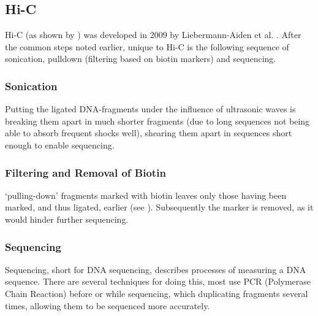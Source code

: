 



\subsection{Hi-C}\label{sec:HiC}

Hi-C (as shown by ) was developed in 2009 by Liebermann-Aiden et al.
\cite{lieberman2009comprehensive}. After the common steps noted earlier, unique
to Hi-C is the following sequence of sonication, pulldown (filtering based on
biotin markers) and sequencing.

\subsubsection{Sonication}\label{sec:sonication}

Putting the ligated DNA-fragments under the influence of ultrasonic waves is
breaking them apart in much shorter fragments (due to long sequences not being
able to absorb frequent shocks well), shearing them apart in sequences short
enough to enable sequencing.

\subsubsection{Filtering and Removal of Biotin}\label{sec:pulldown}

`pulling-down' fragments marked with biotin leaves only those having been
marked, and thus ligated, earlier (see ). Subsequently the
marker is removed, as it would hinder further sequencing.

\subsubsection{Sequencing}\label{sec:sequencing}

Sequencing, short for DNA sequencing, describes processes of measuring a DNA
sequence. There are several techniques for doing this, most use PCR (Polymerase
Chain Reaction) before or while sequencing, which duplicating fragments
several times, allowing them to be sequenced more accurately.

